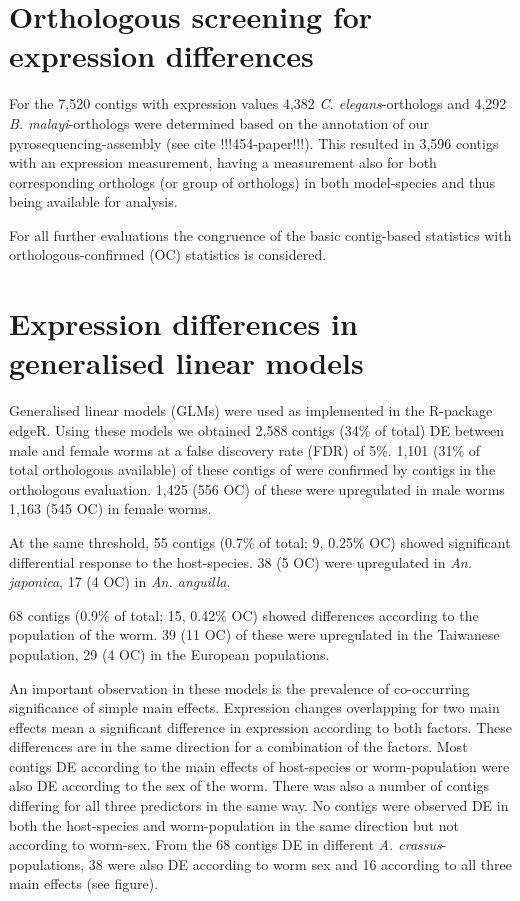 \documentclass[10pt]{article}
\begin{document}
\section{Orthologous screening for expression differences}

For the 7,520 contigs with expression values 4,382
\textit{C. elegans}-orthologs and 4,292 \textit{B. malayi}-orthologs
were determined based on the annotation of our pyrosequencing-assembly
(see cite !!!454-paper!!!). This resulted in 3,596 contigs with an
expression measurement, having a measurement also for both
corresponding orthologs (or group of orthologs) in both model-species
and thus being available for analysis.

For all further evaluations the congruence of the basic contig-based
statistics with orthologous-confirmed (OC) statistics is considered.

\section{Expression differences in generalised linear models}

Generalised linear models (GLMs) were used as implemented in the
R-package edgeR. Using these models we obtained 2,588 contigs (34\% of
total) DE between male and female worms at a false discovery rate
(FDR) of 5\%. 1,101 (31\% of total orthologous available) of these
contigs of were confirmed by contigs in the orthologous
evaluation. 1,425 (556 OC) of these were upregulated in male worms
1,163 (545 OC) in female worms.

At the same threshold, 55 contigs (0.7\% of total; 9, 0.25\% OC)
showed significant differential response to the host-species. 38 (5
OC) were upregulated in \textit{An. japonica}, 17 (4 OC) in
\textit{An. anguilla}.

68 contigs (0.9\% of total; 15, 0.42\% OC) showed differences
according to the population of the worm. 39 (11 OC) of these were
upregulated in the Taiwanese population, 29 (4 OC) in the European
populations.

An important observation in these models is the prevalence of
co-occurring significance of simple main effects. Expression changes
overlapping for two main effects mean a significant difference in
expression according to both factors. These differences are in the
same direction for a combination of the factors. Most contigs DE
according to the main effects of host-species or worm-population were
also DE according to the sex of the worm. There was also a number of
contigs differing for all three predictors in the same way. No contigs
were observed DE in both the host-species and worm-population in the
same direction but not according to worm-sex. From the 68 contigs DE
in different \textit{A. crassus}-populations, 38 were also DE
according to worm sex and 16 according to all three main effects (see
figure).
\end{document}
